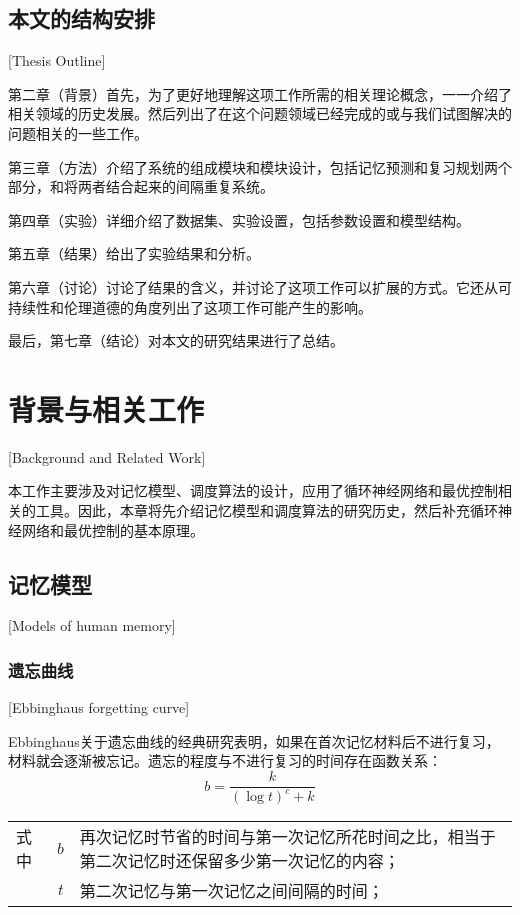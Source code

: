 \section{本文的结构安排}[Thesis Outline]

第二章（背景）首先，为了更好地理解这项工作所需的相关理论概念，一一介绍了相关领域的历史发展。然后列出了在这个问题领域已经完成的或与我们试图解决的问题相关的一些工作。

第三章（方法）介绍了系统的组成模块和模块设计，包括记忆预测和复习规划两个部分，和将两者结合起来的间隔重复系统。

第四章（实验）详细介绍了数据集、实验设置，包括参数设置和模型结构。

第五章（结果）给出了实验结果和分析。

第六章（讨论）讨论了结果的含义，并讨论了这项工作可以扩展的方式。它还从可持续性和伦理道德的角度列出了这项工作可能产生的影响。

最后，第七章（结论）对本文的研究结果进行了总结。

\chapter{背景与相关工作}[Background and Related Work]

本工作主要涉及对记忆模型、调度算法的设计，应用了循环神经网络和最优控制相关的工具。因此，本章将先介绍记忆模型和调度算法的研究历史，然后补充循环神经网络和最优控制的基本原理。

\section{记忆模型}[Models of human memory]

\subsection{遗忘曲线}[Ebbinghaus forgetting curve]

Ebbinghaus关于遗忘曲线的经典研究表明\cite{ebbinghausMemoryContributionExperimental1913}，如果在首次记忆材料后不进行复习，材料就会逐渐被忘记。遗忘的程度与不进行复习的时间存在函数关系：
\begin{equation}
b = \frac{k}{(\log t)^c + k}
\end{equation}
\begin{tabularx}{\textwidth}{@{}l@{\quad}r@{———}X@{}}
    式中& $b$ &再次记忆时节省的时间与第一次记忆所花时间之比，相当于第二次记忆时还保留多少第一次记忆的内容；\\
    &  $t$ &第二次记忆与第一次记忆之间间隔的时间；
\end{tabularx}\vspace{3.15bp}

